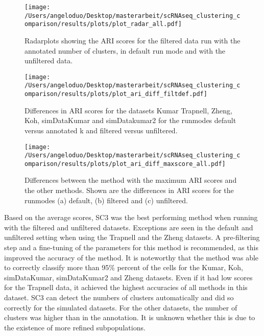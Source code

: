 \documentclass[12pt, a4paper]{article}\usepackage[]{graphicx}\usepackage[]{color}
\begin{document}

\begin{figure}[H]
\centering
\texttt{[image: /Users/angeloduo/Desktop/masterarbeit/scRNAseq\_clustering\_comparison/results/plots/plot\_radar\_all.pdf]}
\caption{Radarplots showing the ARI scores for the filtered data run with the annotated number of clusters, in default run mode and with the unfiltered data.  }
\label{fig:radar}
\end{figure}
\begin{figure}[H]
\begin{center}
\texttt{[image: /Users/angeloduo/Desktop/masterarbeit/scRNAseq\_clustering\_comparison/results/plots/plot\_ari\_diff\_filtdef.pdf]}
\caption{Differences in ARI scores for the datasets Kumar Trapnell, Zheng, Koh, simDataKumar and simDatakumar2 for the runmodes default versus annotated k and filtered versus unfiltered.}
\label{fig:diff}
\end{center}
\end{figure}

\begin{figure}[H]
\centering
\texttt{[image: /Users/angeloduo/Desktop/masterarbeit/scRNAseq\_clustering\_comparison/results/plots/plot\_ari\_diff\_maxscore\_all.pdf]}
\caption{Differences between the method with the maximum ARI scores and the other methods. Shown are the differences in ARI scores for the runmodes (a) default, (b) filtered and (c) unfiltered.  }
\label{fig:aridiff1}
\end{figure}

Based on the average scores, SC3 was the best performing method when running with the filtered and unfiltered datasets. Exceptions are seen in the default and unfiltered setting when using the Trapnell and the Zheng datasets. A pre-filtering step and a fine-tuning of the parameters for this method is recommended, as this improved the accuracy of the method. It is noteworthy that the method was able to correctly classify more than 95\% percent of the cells for the Kumar, Koh, simDataKumar, simDataKumar2 and Zheng datasets. Even if it had low scores for the Trapnell data, it achieved the highest accuracies of all methods in this dataset. SC3 can detect the numbers of clusters automatically and did so correctly for the simulated datasets. For the other datasets, the number of clusters was higher than in the annotation. It is unknown whether this is due to the existence of more refined subpopulations. 
\end{document}
